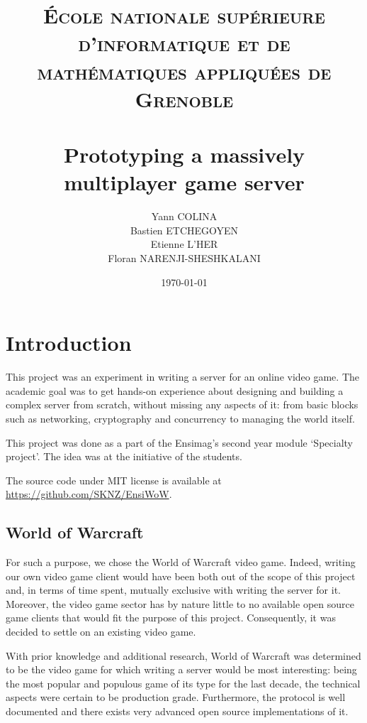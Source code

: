 \documentclass[paper=a4, fontsize=11pt]{scrartcl}
\title{%
    \normalfont{}
    \normalsize{}
    \textsc{École nationale supérieure d'informatique et de mathématiques appliquées de Grenoble} \\ [10pt]
    \horrule{0.5pt} \\[0.4cm]
    \huge Prototyping a massively multiplayer game server
    \horrule{2pt} \\[0.5cm]
}
\author{Yann COLINA\\
Bastien ETCHEGOYEN\\
Etienne L'HER\\
Floran NARENJI-SHESHKALANI}
\date{\normalsize\today}
\begin{document}
\maketitle

\section{Introduction}

This project was an experiment in writing a server for an online
video game.
The academic goal was to get hands-on experience about designing and building a
complex server from scratch, without missing any aspects of it: from basic blocks
such as networking, cryptography and concurrency to managing the world itself.

This project was done as a part of the Ensimag's second year module `Specialty
project'.
The idea was at the initiative of the students.

The source code under MIT license is available at
\url{https://github.com/SKNZ/EnsiWoW}.

\subsection{World of Warcraft}

For such a purpose, we chose the World of Warcraft video game.
Indeed, writing our own video game client would have been both out of the scope
of this project and, in terms of time spent, mutually exclusive with writing the
server for it.
Moreover, the video game sector has by nature little to no available open source
game clients that would fit the purpose of this project.
Consequently, it was decided to settle on an existing video game.

With prior knowledge and additional research, World of Warcraft was determined
to be the video game for which writing a server would be most interesting: being
the most popular and populous game of its type for the last decade, the
technical aspects were certain to be production grade.
Furthermore, the protocol is well documented and there exists very advanced open
source implementations of it.
\end{document}
